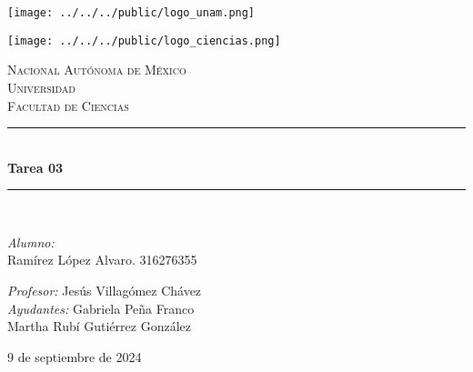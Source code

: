 \begin{center}
    \newcommand{\HRule}{\rule{\linewidth}{0.5mm}}
    \begin{minipage}{0.48\textwidth} 
        \begin{flushleft}
            \texttt{[image: ../../../public/logo\_unam.png]}
        \end{flushleft}
    \end{minipage}
    \begin{minipage}{0.48\textwidth} 
        \begin{flushright}
            \texttt{[image: ../../../public/logo\_ciencias.png]}
        \end{flushright}
    \end{minipage}
    \vspace*{-1.5cm}						
    \textsc{\huge Nacional Autónoma de México \\ \vspace{-4px} Universidad }\\[2cm]	
    \textsc{\LARGE Facultad de Ciencias}\\[1.5cm]
    \vspace*{1cm}					
        \HRule \\[0.7cm]							
            { \huge \bfseries Tarea 03}\\[0.4cm]	
        \HRule \\[1.5cm]						    
    \begin{minipage}{0.52\textwidth}													
        \begin{flushleft} \large	
            \small
            \vspace{-0.6cm}	
            \vspace{-0.6cm}	
                \emph{Alumno:}\\
               Ramírez López Alvaro. 316276355\\
            \vspace*{2cm}
        \end{flushleft}																		
        \end{minipage}		
    \begin{minipage}{0.46\textwidth}		
        \vspace{-0.6cm}											
        \begin{flushright} \large						
            \small										
            \emph{Profesor:} Jesús Villagómez Chávez	\\
            \emph{Ayudantes:}
                Gabriela Peña Franco	 \\
                Martha Rubí Gutiérrez González	 \\
        \end{flushright}																
    \end{minipage}	
    \vspace*{1cm}
    \vspace{2cm}
    \begin{center}						
        {\large 9 de septiembre de 2024}
    \end{center}  						
\end{center}	
\textbf{}
\newpage
